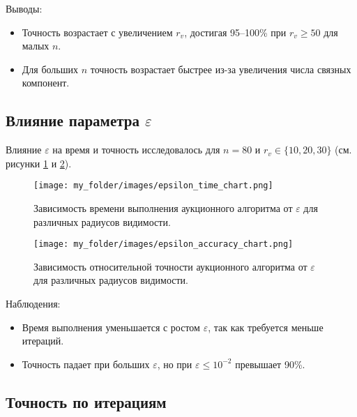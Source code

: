 Выводы:
\begin{itemize}
    \item Точность возрастает с увеличением \( r_v \), достигая 95--100\% при \( r_v \geq 50 \) для малых \( n \).
    \item Для больших \( n \) точность возрастает быстрее из-за увеличения числа связных компонент.
\end{itemize}

\subsection{Влияние параметра \( \varepsilon \)}

\vspace{0.3cm}

Влияние \( \varepsilon \) на время и точность исследовалось для \( n = 80 \) и \( r_v \in \{10, 20, 30\} \) (см. рисунки \ref{fig:epsilon_time_chart} и \ref{fig:epsilon_accuracy_chart}).

\begin{figure}[h]
    \centering
    \texttt{[image: my\_folder/images/epsilon\_time\_chart.png]}
    \caption{Зависимость времени выполнения аукционного алгоритма от \( \varepsilon \) для различных радиусов видимости.}
    \label{fig:epsilon_time_chart}
\end{figure}

\begin{figure}[h]
    \centering
    \texttt{[image: my\_folder/images/epsilon\_accuracy\_chart.png]}
    \caption{Зависимость относительной точности аукционного алгоритма от \( \varepsilon \) для различных радиусов видимости.}
    \label{fig:epsilon_accuracy_chart}
\end{figure}

Наблюдения:
\begin{itemize}
    \item Время выполнения уменьшается с ростом \( \varepsilon \), так как требуется меньше итераций.
    \item Точность падает при больших \( \varepsilon \), но при \( \varepsilon \leq 10^{-2} \) превышает 90\%.
\end{itemize}

\subsection{Точность по итерациям}

\vspace{0.3cm}

